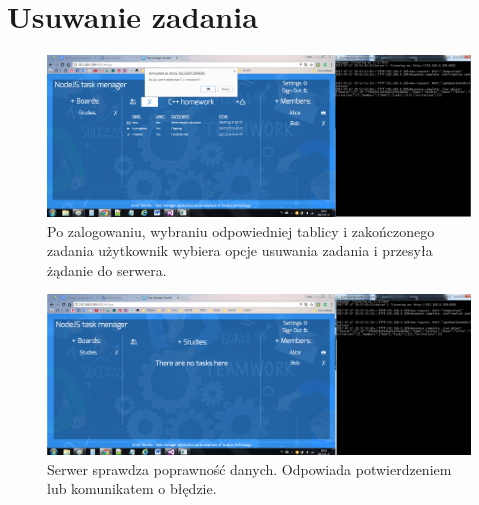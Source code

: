 \documentclass[12pt]{report}
\begin{document}
\section{Usuwanie zadania}
\begin{figure}[!hb]
\centering
\includegraphics[width=\textwidth,height=\textheight,keepaspectratio]{C1.png}
\captionsetup{labelformat=empty}
\caption[]{Po zalogowaniu, wybraniu odpowiedniej tablicy i zakończonego zadania użytkownik wybiera opcje usuwania zadania i przesyła żądanie do serwera.}
\end{figure}
\begin{figure}[!hb]
\centering
\includegraphics[width=\textwidth,height=\textheight,keepaspectratio]{C2.png}
\captionsetup{labelformat=empty}
\caption[]{Serwer sprawdza poprawność danych. Odpowiada potwierdzeniem lub komunikatem o błędzie.}
\end{figure}
\end{document}

